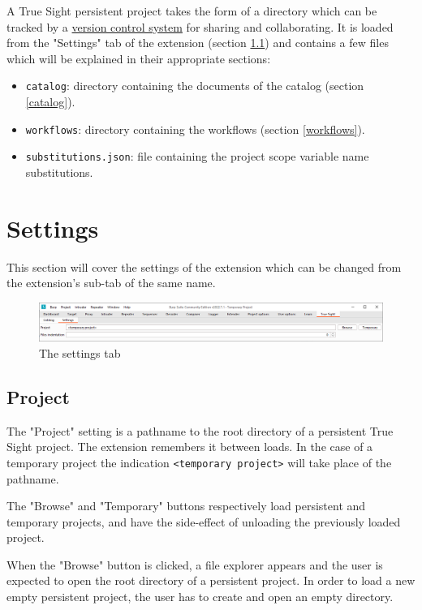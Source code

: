 \documentclass{article}
\begin{document}
A True Sight persistent project takes the form of a directory which can be tracked by a \href{https://en.wikipedia.org/wiki/Version_control}{version control system} for sharing and collaborating. It is loaded from the "Settings" tab of the extension (section \ref{settings project}) and contains a few files which will be explained in their appropriate sections:
\begin{itemize}
    \item \verb|catalog|: directory containing the documents of the catalog (section \ref{catalog}).
    \item \verb|workflows|: directory containing the workflows (section \ref{workflows}).
    \item \verb|substitutions.json|: file containing the project scope variable name substitutions.
\end{itemize}

\section{Settings}

This section will cover the settings of the extension which can be changed from the extension's sub-tab of the same name.

\begin{figure}[h]
    \centering
    \includegraphics[width=\textwidth]{assets/settings.png}
    \caption{The settings tab}
    \label{fig:settings}
\end{figure}

\subsection{Project} \label{settings project}

The "Project" setting is a pathname to the root directory of a persistent True Sight project. The extension remembers it between loads. In the case of a temporary project the indication \verb|<temporary project>| will take place of the pathname.

The "Browse" and "Temporary" buttons respectively load persistent and temporary projects, and have the side-effect of unloading the previously loaded project.

When the "Browse" button is clicked, a file explorer appears and the user is expected to open the root directory of a persistent project. In order to load a new empty persistent project, the user has to create and open an empty directory.
\end{document}
